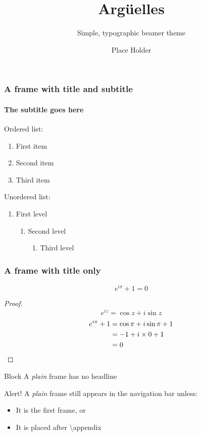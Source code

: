 \documentclass{beamer}
\title{Argüelles}
\subtitle{Simple, typographic beamer theme}
\date{}
\author{Place Holder}
\institute{University of Git \\ Department of \TeX}
\begin{document}
  \frame[plain]{\titlepage}


  \begin{frame}
    \frametitle{A frame with title and subtitle}
    \framesubtitle{The subtitle goes here}
    Ordered list:
    \begin{enumerate}
      \item First item
      \item Second item
      \item Third item
    \end{enumerate}
    \vfill
    Unordered list:
    \begin{enumerate}[$\bullet$]
      \item First level
      \begin{enumerate}[$\circ$]
        \item Second level
        \begin{enumerate}[\textbullet]
          \item Third level
        \end{enumerate}
      \end{enumerate}
    \end{enumerate}
  \end{frame}

  \begin{frame}
    \frametitle{A frame with title only}
    \begin{theorem}
      \[e^{i\pi}+1=0\]
      \begin{proof}
        \begin{equation*}
          e^{iz}=\cos{z}+i\sin{z}
        \end{equation*}
        \begin{align*}
          e^{i\pi}+1 & \null=\cos\pi+i\sin\pi+1 \\
          & \null=-1+i\times0+1 \\
          & \null=0
        \end{align*}
      \end{proof}
    \end{theorem}
  \end{frame}

  \begin{frame}[plain]
    \begin{block}{Block}
      A \textit{plain} frame has no headline
    \end{block}
    \vfill
    \begin{alert}{Alert!}
      A \textit{plain} frame still appears in the navigation bar unless:
      \begin{itemize}
        \item It is the first frame, or
        \item It is placed after \textsf{\textbackslash appendix}
      \end{itemize}
    \end{alert}
  \end{frame}
\end{document}
